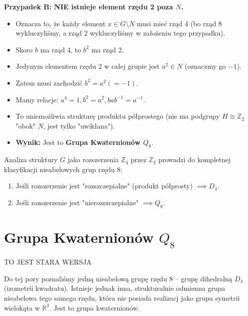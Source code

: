 \begin{enumerate}[label=\Roman*]
    \textbf{Przypadek B: NIE istnieje element rzędu 2 poza $N$.}
    \begin{itemize}
        \item Oznacza to, że każdy element $x \in G \setminus N$ musi mieć rząd 4 (bo rząd 8 wykluczyliśmy, a rząd 2 wykluczyliśmy w założeniu tego przypadku).
        \item Skoro $b$ ma rząd 4, to $b^2$ ma rząd 2.
        \item Jedynym elementem rzędu 2 w całej grupie jest $a^2 \in N$ (oznaczmy go $-1$).
        \item Zatem musi zachodzić $b^2 = a^2 (= -1)$.
        \item Mamy relacje: $a^4=1, b^2=a^2, bab^{-1}=a^{-1}$.
        \item To uniemożliwia strukturę produktu półprostego (nie ma podgrupy $H \cong \mathbb{Z}_2$ "obok" $N$, jest tylko "uwikłana").
        \item \textbf{Wynik:} Jest to \textbf{Grupa Kwaternionów $Q_8$}.
    \end{itemize}
\end{enumerate} 

\begin{remark}
    Analiza struktury $G$ jako rozszerzenia $\mathbb{Z}_4$ przez $\mathbb{Z}_2$ prowadzi do kompletnej klasyfikacji nieabelowych grup rzędu 8:
    \begin{enumerate}
        \item Jeśli rozszerzenie jest "rozszczepialne" (produkt półprosty) $\implies D_4$.
        \item Jeśli rozszerzenie jest "nierozszczepialne" $\implies Q_8$.
    \end{enumerate}
\end{remark}

\section{Grupa Kwaternionów $Q_8$}
TO JEST STARA WERSJA
\begin{context}
    Do tej pory poznaliśmy jedną nieabelową grupę rzędu 8 – grupę dihedralną $D_4$ (izometrii kwadratu). Istnieje jednak inna, strukturalnie odmienna grupa nieabelowa tego samego rzędu, która nie posiada realizacj jako grupa symetrii wielokąta w $\mathbb{R}^3$. Jest to grupa kwaternionów.
\end{context}

